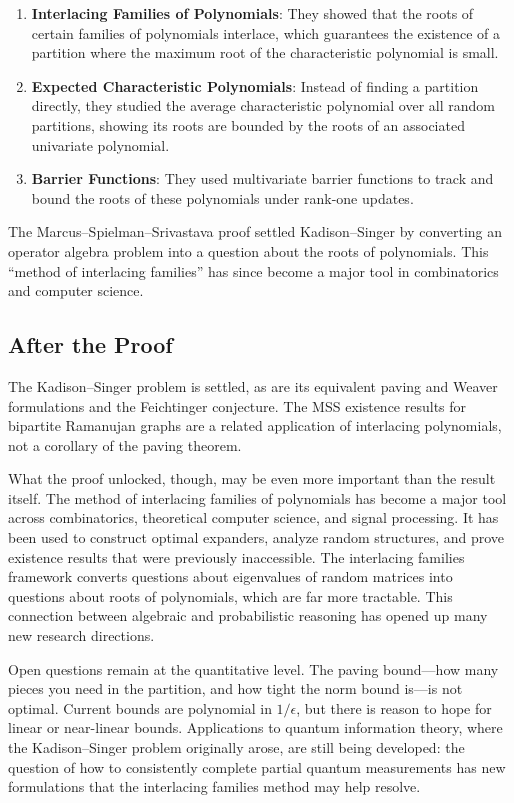 \begin{enumerate}
\item \textbf{Interlacing Families of Polynomials}: They showed that the roots of certain families of polynomials interlace, which guarantees the existence of a partition where the maximum root of the characteristic polynomial is small.
\item \textbf{Expected Characteristic Polynomials}: Instead of finding a partition directly, they studied the average characteristic polynomial over all random partitions, showing its roots are bounded by the roots of an associated univariate polynomial.
\item \textbf{Barrier Functions}: They used multivariate barrier functions to track and bound the roots of these polynomials under rank-one updates.
\end{enumerate}

\begin{highlightbox}
The Marcus--Spielman--Srivastava proof settled Kadison--Singer by converting an operator algebra problem into a question about the roots of polynomials. This ``method of interlacing families'' has since become a major tool in combinatorics and computer science.
\end{highlightbox}

\subsection{After the Proof}

The Kadison--Singer problem is settled, as are its equivalent paving and Weaver formulations and the Feichtinger conjecture. The MSS existence results for bipartite Ramanujan graphs are a related application of interlacing polynomials, not a corollary of the paving theorem.

What the proof unlocked, though, may be even more important than the result itself. The method of interlacing families of polynomials has become a major tool across combinatorics, theoretical computer science, and signal processing. It has been used to construct optimal expanders, analyze random structures, and prove existence results that were previously inaccessible. The interlacing families framework converts questions about eigenvalues of random matrices into questions about roots of polynomials, which are far more tractable. This connection between algebraic and probabilistic reasoning has opened up many new research directions.

Open questions remain at the quantitative level. The paving bound---how many pieces you need in the partition, and how tight the norm bound is---is not optimal. Current bounds are polynomial in $1/\epsilon$, but there is reason to hope for linear or near-linear bounds. Applications to quantum information theory, where the Kadison--Singer problem originally arose, are still being developed: the question of how to consistently complete partial quantum measurements has new formulations that the interlacing families method may help resolve.

